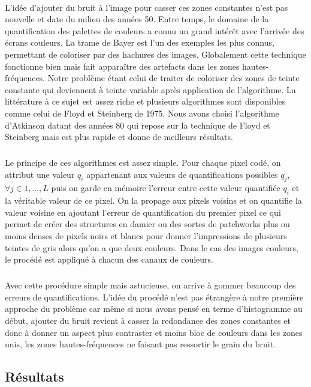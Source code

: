 \documentclass{article}
\begin{document}
\paragraph*{}
L'idée d'ajouter du bruit à l'image pour casser ces zones constantes n'est pas nouvelle et date du milieu des années 50. Entre temps, le domaine de la quantification des palettes de couleurs a connu un grand intérêt avec l'arrivée des écrans couleurs. La trame de Bayer est l'un des exemples les plus connus, permettant de coloriser par des hachures des images. Globalement cette technique fonctionne bien mais fait apparaître des artefacts dans les zones hautes-fréquences. Notre problème étant celui de traiter de coloriser des zones de teinte constante qui deviennent à teinte variable après application de l'algorithme. La littérature à ce sujet est assez riche et plusieurs algorithmes sont disponibles comme celui de Floyd et Steinberg de 1975. Nous avons choisi l'algorithme d'Atkinson datant des années 80 qui repose sur la technique de Floyd et Steinberg mais est plus rapide et donne de meilleurs résultats.
\subparagraph*{}
Le principe de ces algorithmes est assez simple. Pour chaque pixel codé, on attribut une valeur $q_i$ appartenant aux valeurs de quantifications possibles $q_j$, $\forall j \in {1,..., L}$ puis on garde en mémoire l'erreur entre cette valeur quantifiée $q_i$ et la véritable valeur de ce pixel. On la propage aux pixels voisins et on quantifie la valeur voisine en ajoutant l'erreur de quantification du premier pixel ce qui permet de créer des structures en damier ou des sortes de patchworks plus ou moins denses de pixels noirs et blancs pour donner l'impressions de plusieurs teintes de gris alors qu'on a que deux couleurs. Dans le cas des images couleurs, le procédé est appliqué à chacun des canaux de couleurs.
\subparagraph*{}
Avec cette procédure simple mais astucieuse, on arrive à gommer beaucoup des erreurs de quantifications. L'idée du procédé n'est pas étrangère à notre première approche du problème car même si nous avons pensé en terme d'histogramme au début, ajouter du bruit revient à casser la redondance des zones constantes et donc à donner un aspect plus contraster et moins bloc de couleurs dans les zones unis, les zones hautes-fréquences ne faisant pas ressortir le grain du bruit.

\subsection*{Résultats}
\end{document}
